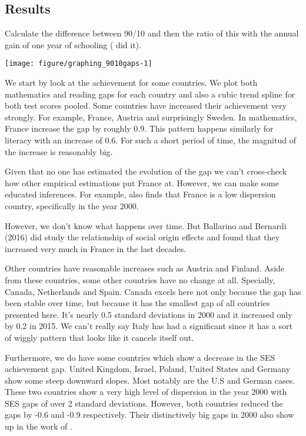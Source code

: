 \documentclass[11pt, a4paper]{article}\usepackage[]{graphicx}\usepackage[]{color}
\begin{document}
\subsection{Results}

Calculate the difference between 90/10 and then the ratio of this with the annual gain of one year of schooling (\citet{micklewright} did it).



{\centering \texttt{[image: figure/graphing\_9010gaps-1]} 

}




We start by look at the achievement for some countries. We plot both mathematics and reading gaps for each country and also a cubic trend spline for both test scores pooled. Some countries have increased their achievement very strongly. For example, France, Austria and surprisingly Sweden. In mathematics, France increase the gap by roughly 0.9. This pattern happens similarly for literacy with an increase of 0.6. For such a short period of time, the magnitud of the increase is reasonably big.

Given that no one has estimated the evolution of the gap we can't cross-check how other empirical estimations put France at. However, we can make some educated inferences.  For example, \citet{micklewright} also finds that France is a low dispersion country, specifically in the year 2000.

However, we don't know what happens over time. But Ballarino and Bernardi (2016) did study the relationship of social origin effects and found that they increased very much in France in the last decades.

Other countries have reasonable increases such as Austria and Finland. Aside from these countries, some other countries have no change at all. Specially, Canada, Netherlands and Spain. Canada excels here not only because the gap has been stable over time, but because it has the smallest gap of all countries presented here. It's nearly 0.5 standard deviations in 2000 and it increased only by 0.2 in 2015. We can't really say Italy has had a significant since it has a sort of wiggly pattern that looks like it cancels itself out.

Furthermore, we do have some countries which show a decrease in the SES achievement gap. United Kingdom, Israel, Poland, United States and Germany show some steep downward slopes. Most notably are the U.S and German cases. These two countries show a very high level of dispersion in the year 2000 with SES gaps of over 2 standard deviations. However, both countries reduced the gaps by -0.6 and -0.9 respectively. Their distinctively big gaps in 2000 also show up in the work of \citet{micklewright}.
\end{document}
